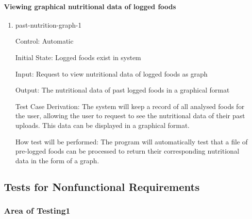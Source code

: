 \documentclass[12pt, titlepage]{article}
\begin{document}
	\paragraph{Viewing graphical nutritional data of logged foods}
	
	\begin{enumerate}
		
		\item{past-nutrition-graph-1\\}
		
		Control: Automatic
		
		Initial State: Logged foods exist in system
		
		Input: Request to view nutritional data of logged foods as graph
		
		Output: The nutritional data of past logged foods in a graphical format
		
		Test Case Derivation: The system will keep a record of all analysed foods for the user, allowing the user to request to see the nutritional data of their past uploads. This data can be displayed in a graphical format.
		
		How test will be performed: The program will automatically test that a file of pre-logged foods can be processed to return their corresponding nutritional data in the form of a graph.
		
	\end{enumerate}
	
	\subsection{Tests for Nonfunctional Requirements}
	
	
	
	
	\subsubsection{Area of Testing1}
	
\end{document}
